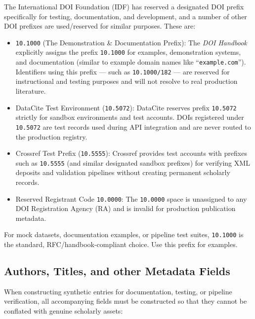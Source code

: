 \documentclass[12pt, twoside]{article}
\begin{document}
The International DOI Foundation (IDF) has reserved a designated \gls{DOI} prefix specifically for testing, documentation, and development, and a number of other \gls{DOI} prefixes are used/reserved for similar purposes. These are:
\begin{itemize}
    \item \texttt{10.1000} (The Demonstration \& Documentation Prefix):
The \textit{DOI Handbook} explicitly assigns the prefix \texttt{10.1000} for examples, demonstration systems, and documentation (similar to example domain names like \enquote{\texttt{example.com}}). Identifiers using this prefix --- such as \texttt{10.1000/182} --- are reserved for instructional and testing purposes and will not resolve to real production literature.

    \item DataCite Test Environment (\texttt{10.5072}):
DataCite reserves prefix \texttt{10.5072} strictly for sandbox environments and test accounts. \glspl{DOI} registered under \texttt{10.5072} are test records used during API integration and are never routed to the production registry.

    \item Crossref Test Prefix (\texttt{10.5555}):
Crossref provides test accounts with prefixes such as \texttt{10.5555} (and similar designated sandbox prefixes) for verifying \gls{XML} deposits and validation pipelines without creating permanent scholarly records.

    \item Reserved Registrant Code \texttt{10.0000}:
The \texttt{10.0000} space is unassigned to any \gls{DOI} Registration Agency (RA) and is invalid for production publication metadata.
\end{itemize}

For mock datasets, documentation examples, or pipeline test suites, \texttt{10.1000} is the standard, RFC/handbook-compliant choice. Use this prefix for examples.

\subsection{Authors, Titles, and other Metadata Fields}

When constructing synthetic entries for documentation, testing, or pipeline verification, all accompanying fields must be constructed so that they cannot be conflated with genuine scholarly assets:
\end{document}

